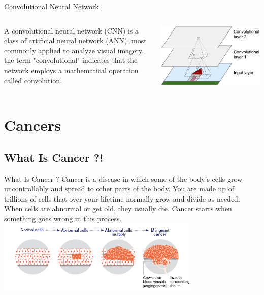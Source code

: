 \documentclass{beamer}
\begin{document}
    \begin{frame}{Convolutional Neural Network}
      \begin{columns}
        \begin{column}{0.5\textwidth}
          A convolutional neural network (CNN)
          is a class of artificial neural network (ANN), 
          most commonly applied to analyze visual imagery. \\
          the term "convolutional" indicates that the network employs a mathematical operation called convolution.
        \end{column}
        \begin{column}{0.4\textwidth}
          \includegraphics{resources/cnn}
          
        \end{column}
      \end{columns}
    \end{frame}

    \section{Cancers}
    \subsection{What Is Cancer ?!}
    \begin{frame}{What Is Cancer ?} 
      \centering
      \justifying Cancer is a disease in which some of the body’s cells grow uncontrollably and spread to other parts of the body. 
      You are made up of trillions of cells that over your lifetime normally grow and divide as needed. When cells are abnormal or get old, they usually die. Cancer starts when something goes wrong in this process.
      \vfill
      \includegraphics[height=3.5cm]{resources/How_cancer_starts}
    \end{frame}
\end{document}
